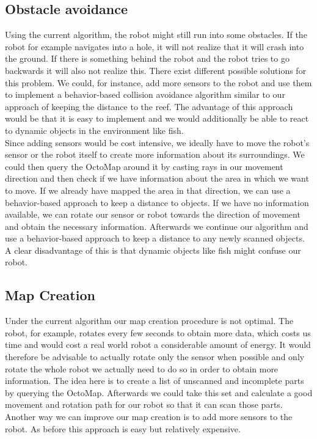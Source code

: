 \documentclass[twoside, 12pt]{article}
\begin{document}
\subsection{Obstacle avoidance}
Using the current algorithm, the robot might still run into some obstacles. If the robot for example navigates into a hole, it will not realize that it will crash into the ground. If there is something behind the robot and the robot tries to go backwards it will also not realize this. There exist different possible solutions for this problem. We could, for instance, add more sensors to the robot and use them to implement a behavior-based collision avoidance algorithm similar to our approach of keeping the distance to the reef. The advantage of this approach would be that it is easy to implement and we would additionally be able to react to dynamic objects in the environment like fish.\\

Since adding sensors would be cost intensive, we ideally have to move the robot's sensor or the robot itself to create more information about its surroundings. We could then query the OctoMap around it by casting rays in our movement direction and then check if we have information about the area in which we want to move. If we already have mapped the area in that direction, we can use a behavior-based approach to keep a distance to objects. If we have no information available, we can rotate our sensor or robot towards the direction of movement and obtain the necessary information. Afterwards we continue our algorithm and use a behavior-based approach to keep a distance to any newly scanned objects. A clear disadvantage of this is that dynamic objects like fish might confuse our robot.\\

\subsection{Map Creation}
Under the current algorithm our map creation procedure is not optimal. The robot, for example, rotates every few seconds to obtain more data, which costs us time and would cost a real world robot a considerable amount of energy. It would therefore be advisable to actually rotate only the sensor when possible and only rotate the whole robot we actually need to do so in order to obtain more information. The idea here is to create a list of unscanned and incomplete parts by querying the OctoMap. Afterwards we could take this set and calculate a good movement and rotation path for our robot so that it can scan those parts. Another way we can improve our map creation is to add more sensors to the robot. As before this approach is easy but relatively expensive.\\
\end{document}
